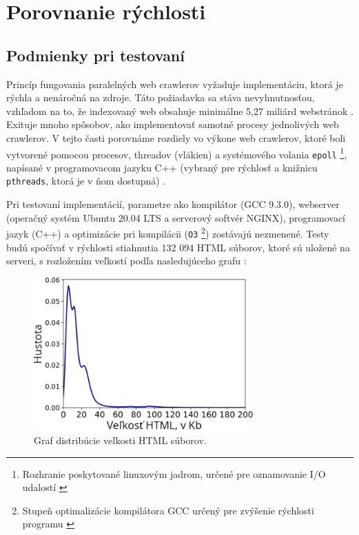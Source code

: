 \documentclass[10pt,twoside,slovak,a4paper]{article}
\begin{document}
\newpage

\section{Porovnanie rýchlosti}

\subsection{Podmienky pri testovaní}

Princíp fungovania paralelných web crawlerov vyžaduje implementáciu, ktorá je rýchla a nenáročná na zdroje. Táto požiadavka sa stáva nevyhnutnosťou, vzhľadom na to, že indexovaný web obsahuje minimálne 5,27 miliárd webstránok \cite{9648837}. Exituje mnoho spôsobov, ako implementovať samotné procesy jednolivých web crawlerov. V tejto časti porovnáme rozdiely vo výkone web crawlerov, ktoré boli vytvorené pomocou procesov, threadov (vlákien) a systémového volania \texttt{epoll} \footnote{Rozhranie poskytované linuxovým jadrom, určené pre oznamovanie I/O udalostí \cite{kerrisk2010linux}}, napísané v programovacom jazyku C++ (vybraný pre rýchlosť a knižnicu \texttt{pthreads}, ktorá je v ňom dostupná) \cite{9648837}.

Pri testovaní implementácií, parametre ako kompilátor (GCC 9.3.0), webserver (operačný systém Ubuntu 20.04 LTS a serverový softvér NGINX), programovací jazyk (C++) a optimizácie pri kompilácii (\texttt{O3} \footnote{Stupeň optimalizácie kompilátora GCC určený pre zvýšenie rýchlosti programu \cite{stallman2009using}}) zostávajú nezmenené. Testy budú spočívať v rýchlosti stiahnutia 132 094 HTML súborov, ktoré sú uložené na serveri, s rozložením veľkostí podľa nasledujúceho grafu \cite{9648837}:

\begin{figure}[hbt!]
    \centering
    \includegraphics[width=0.75\textwidth]{dataset.png}
    \caption{Graf distribúcie veľkosti HTML súborov. \cite{9648837}}
\end{figure}
\end{document}
